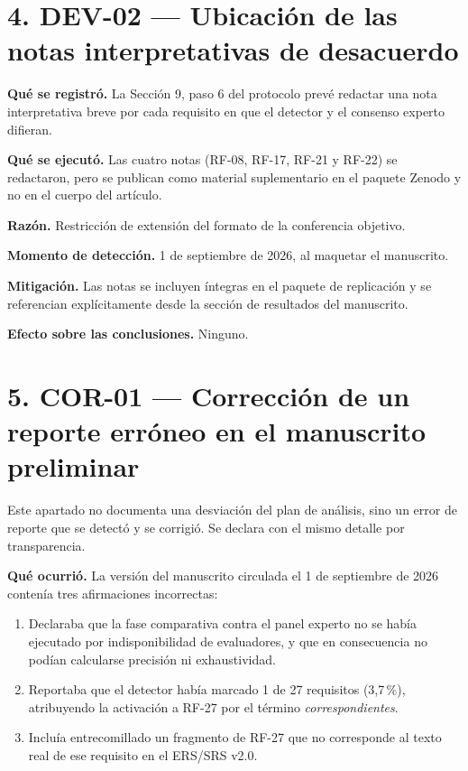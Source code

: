 \documentclass[11pt,a4paper]{article}
\begin{document}
\section*{4. DEV-02 --- Ubicación de las notas interpretativas de desacuerdo}

\textbf{Qué se registró.} La Sección 9, paso 6 del protocolo prevé redactar una
nota interpretativa breve por cada requisito en que el detector y el consenso
experto difieran.

\textbf{Qué se ejecutó.} Las cuatro notas (RF-08, RF-17, RF-21 y RF-22) se
redactaron, pero se publican como material suplementario en el paquete Zenodo y
no en el cuerpo del artículo.

\textbf{Razón.} Restricción de extensión del formato de la conferencia
objetivo.

\textbf{Momento de detección.} 1 de septiembre de 2026, al maquetar el
manuscrito.

\textbf{Mitigación.} Las notas se incluyen íntegras en el paquete de
replicación y se referencian explícitamente desde la sección de resultados del
manuscrito.

\textbf{Efecto sobre las conclusiones.} Ninguno.

\section*{5. COR-01 --- Corrección de un reporte erróneo en el manuscrito
preliminar}

Este apartado no documenta una desviación del plan de análisis, sino un error
de reporte que se detectó y se corrigió. Se declara con el mismo detalle por
transparencia.

\textbf{Qué ocurrió.} La versión del manuscrito circulada el 1 de septiembre de
2026 contenía tres afirmaciones incorrectas:

\begin{enumerate}
\item Declaraba que la fase comparativa contra el panel experto no se había
      ejecutado por indisponibilidad de evaluadores, y que en consecuencia no
      podían calcularse precisión ni exhaustividad.
\item Reportaba que el detector había marcado 1 de 27 requisitos (3,7\,\%),
      atribuyendo la activación a RF-27 por el término
      \textit{correspondientes}.
\item Incluía entrecomillado un fragmento de RF-27 que no corresponde al texto
      real de ese requisito en el ERS/SRS v2.0.
\end{enumerate}
\end{document}
